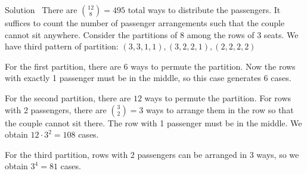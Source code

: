 \documentclass{beamer}
\theoremstyle{definition}
\newenvironment{prooff}{{\noindent\it\textcolor{cyan!40!black}{Proof}:}\,}{\par}
\begin{document}
\begin{frame}{Solution}
    \begin{prooff}
        There are $\binom{12}{8}=495$ total ways to distribute the passengers. It suffices to count the number of passenger arrangements such that the couple cannot sit anywhere. Consider the partitions of $8$ among the rows of $3$ seats.
        We have third pattern of partition: $(3,3,1,1),(3,2,2,1),(2,2,2,2)$

        For the first partition, there are $6$ ways to permute the partition. Now the rows with exactly 1 passenger must be in the middle, so this case generates 6 cases.

        For the second partition, there are $12$ ways to permute the partition. For rows with 2 passengers, there are $\binom{3}{2}=3$ ways to arrange them in the row so that the couple cannot sit there. The row with 1 passenger must be in the middle. We obtain $12 \cdot 3^2=108$ cases.
    \end{prooff}
\end{frame}
For the third partition, rows with 2 passengers can be arranged in 3 ways, so we obtain $3^4=81$ cases.
\end{document}
